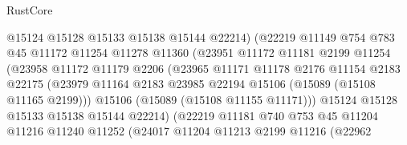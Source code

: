 \begin{lexlean}{RustCore}
\begin{coremodule}
                                @15124
                                @15128
                                @15133
                                @15138
                                @15144
                                @22214)
                              (@22219
                                @11149
                                @754
                                @783
                                @45
                                @11172
                                @11254
                                @11278
                                @11360
                                (@23951
                                  @11172
                                  @11181
                                  @2199
                                  @11254
                                  (@23958
                                    @11172
                                    @11179
                                    @2206
                                    (@23965
                                      @11171
                                      @11178
                                      @2176
                                      @11154
                                      @2183
                                      @22175
                                      (@23979
                                        @11164
                                        @2183
                                        @23985
                                        @22194
                                        @15106
                                        (@15089 (@15108 @11165 @2199)))
                                      @15106
                                      (@15089 (@15108 @11155 @11171)))
                                    @15124
                                    @15128
                                    @15133
                                    @15138
                                    @15144
                                    @22214)
                                  (@22219
                                    @11181
                                    @740
                                    @753
                                    @45
                                    @11204
                                    @11216
                                    @11240
                                    @11252
                                    (@24017
                                      @11204
                                      @11213
                                      @2199
                                      @11216
                                      (@22962

\end{coremodule}
\end{lexlean}
